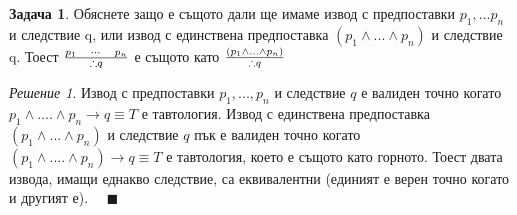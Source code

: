 \documentclass[10pt, a4paper]{article}
\theoremstyle{definition}
\newtheorem{problem}{Задача}
\theoremstyle{remark}
\newtheorem*{sol}{Решение}
\begin{document}
\hfill
\begin{problem}
    Обяснете защо е същото дали ще имаме извод с предпоставки \(p_1, ... p_n\) и следствие q, или извод с единствена предпоставка \((p_1\wedge ... \wedge p_n)\) и следствие q. 
    Тоест \(p_1\quad \cdots\quad p_n \over \therefore q\) е същото като \((p_1\wedge ... \wedge p_n) \over \therefore q\)
\end{problem}
\begin{sol}
    Извод с предпоставки \(p_1,...,p_n\) и следствие \(q\) е валиден точно когато \(p_1\wedge....\wedge p_n\rightarrow q\equiv T\) е тавтология. Извод с единствена предпоставка \((p_1\wedge ... \wedge p_n)\) и следствие \(q\) пък е валиден точно когато \((p_1\wedge....\wedge p_n)\rightarrow q\equiv T\) е тавтология, което е същото като горното. Тоест двата извода, имащи еднакво следствие, са еквивалентни (единият е верен точно когато и другият е). \(\quad\blacksquare\)
\end{sol}
\end{document}
